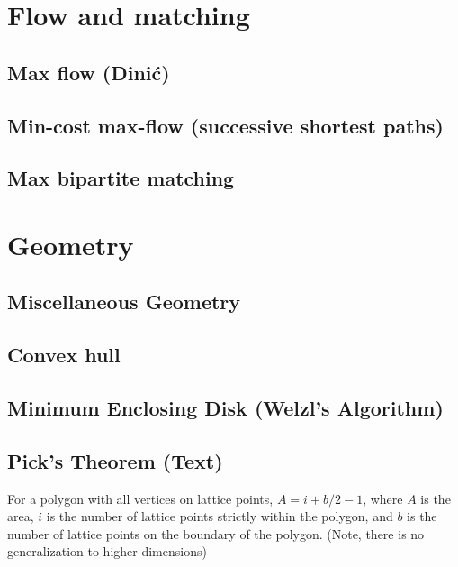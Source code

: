 \documentclass[10pt]{extarticle}
\begin{document}
\begin{multicols*}{2}
\setlength{\parskip}{0.0in}
\tableofcontents
\setlength{\parskip}{0.1in}
\section{Flow and matching}

\subsection{Max flow (Dini\'c)} %


\subsection{Min-cost max-flow (successive shortest paths)}


\subsection{Max bipartite matching} %





\section{Geometry}

\subsection{Miscellaneous Geometry} %



\subsection{Convex hull} %


\subsection{Minimum Enclosing Disk (Welzl's Algorithm)} 


\subsection{Pick's Theorem (Text)} %
For a polygon with all vertices on lattice points, $A = i + b/2 - 1$, where $A$
is the area, $i$ is the number of lattice points strictly within the polygon,
and $b$ is the number of lattice points on the boundary of the polygon. (Note,
there is no generalization to higher dimensions)


\end{multicols*}
\end{document}
